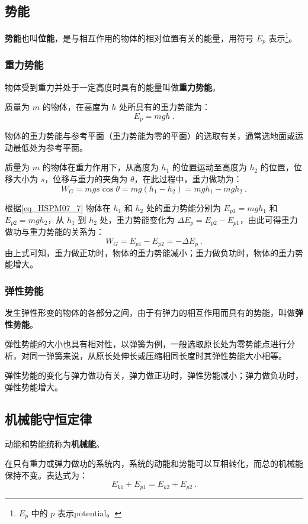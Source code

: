 \subsection{势能}\label{sub_HSPM07_1}

\textbf{势能}也叫\textbf{位能}，是与相互作用的物体的相对位置有关的能量，用符号 $E_p$ 表示\footnote{$E_p$ 中的 $p$ 表示potential。}。

\subsubsection{重力势能}

物体受到重力并处于一定高度时具有的能量叫做\textbf{重力势能}。

质量为 $m$ 的物体，在高度为 $h$ 处所具有的重力势能为：
\begin{equation}\label{eq_HSPM07_7}
E_p=mgh~.
\end{equation}

物体的重力势能与参考平面（重力势能为零的平面）的选取有关，通常选地面或运动最低处为参考平面。

质量为 $m$ 的物体在重力作用下，从高度为 $h_1$ 的位置运动至高度为 $h_2$ 的位置，位移大小为 $s$，位移与重力的夹角为 $\theta$，在此过程中，重力做功为：
\begin{equation}
W_G=mgs\cos \theta=mg(h_1-h_2)=mgh_1-mgh_2~.
\end{equation}

根据\autoref{eq_HSPM07_7} 物体在 $h_1$ 和 $h_2$ 处的重力势能分别为 $E_{p1}=mgh_1$ 和 $E_{p2}=mgh_2$，从 $h_1$ 到 $h_2$ 处，重力势能变化为 $\Delta E_p= E_{p2}-E_{p1}$，由此可得重力做功与重力势能的关系为：
\begin{equation}
W_G=E_{p1}-E_{p2}=-\Delta E_p~.
\end{equation}
由上式可知，重力做正功时，物体的重力势能减小；重力做负功时，物体的重力势能增大。

\subsubsection{弹性势能}

发生弹性形变的物体的各部分之间，由于有弹力的相互作用而具有的势能，叫做\textbf{弹性势能}。

弹性势能的大小也具有相对性，以弹簧为例，一般选取原长处为零势能点进行分析，对同一弹簧来说，从原长处伸长或压缩相同长度时其弹性势能大小相等。

弹性势能的变化与弹力做功有关，弹力做正功时，弹性势能减小；弹力做负功时，弹性势能增大。

\subsection{机械能守恒定律}

动能和势能统称为\textbf{机械能}。

在只有重力或弹力做功的系统内，系统的动能和势能可以互相转化，而总的机械能保持不变。表达式为：
\begin{equation}
E_{k1}+E_{p1}=E_{k2}+E_{p2}~.
\end{equation}


